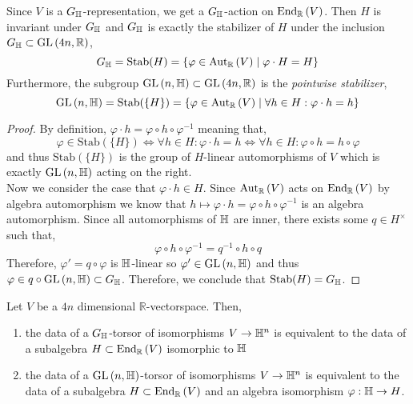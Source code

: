 \documentclass[12pt]{extarticle}
\newcommand{\R}{\mathbb{R}}
\begin{document}
\begin{lemma}
Since $V$ is a $G_{\mathbb{H}}$-representation, we get a $G_{\mathbb{H}}$-action on $\End{\R}{V}$. Then $H$ is invariant under $G_{\mathbb{H}}$ and $G_{\mathbb{H}}$ is exactly the stabilizer of $H$ under the inclusion $G_{\H} \subset \GL{4n, \R}$,
\[ G_{\H} = \mathrm{Stab}(H) = \{ \varphi \in \Aut{\R}{V} \mid \varphi \cdot H = H \} \]
Furthermore, the subgroup $\GL{n, \H} \subset \GL{4n, \R}$ is the \textit{pointwise stabilizer},
\[ \GL{n, \H} = \mathrm{Stab}(\{ H \}) = \{ \varphi \in \Aut{\R}{V} \mid \forall h \in H : \varphi \cdot h = h \} \]
\end{lemma}

\begin{proof}
By definition, $\varphi \cdot h = \varphi \circ h \circ \varphi^{-1}$ meaning that,
\[ \varphi \in \mathrm{Stab}(\{ H \}) \iff \forall h  \in H : \varphi \cdot h = h \iff \forall h \in H : \varphi \circ h = h \circ \varphi \]
and thus $\mathrm{Stab}(\{ H \})$ is the group of $H$-linear automorphisms of $V$ which is exactly $\mathrm{GL}\left(n, \mathbb{H} \right)$ acting on the right.
\bigskip\\
Now we consider the case that $\varphi \cdot h \in H$. Since $\Aut{\R}{V}$ acts on $\End{\R}{V}$ by algebra automorphism we know that $h \mapsto \varphi \cdot h = \varphi \circ h \circ \varphi^{-1}$ is an algebra automorphism. Since all automorphisms of $\mathbb{H}$ are inner, there exists some $q \in H^\times$ such that,
\[ \varphi \circ h \circ \varphi^{-1} = q^{-1} \circ h \circ q \]
Therefore, $\varphi' = q \circ \varphi$ is $\mathbb{H}$-linear so $\varphi' \in \mathrm{GL}\left(n, \mathbb{H} \right)$ and thus $\varphi \in q \circ \mathrm{GL}\left(n, \mathbb{H} \right) \subset G_{\mathbb{H}}$. Therefore, we conclude that $\mathrm{Stab}(H) = G_{\mathbb{H}}$.
\end{proof}

\begin{prop}
Let $V$ be a $4n$ dimensional $\R$-vectorspace. Then,
\begin{enumerate}
\item the data of a $G_{\mathbb{H}}$-torsor of isomorphisms $V \to \mathbb{H}^n$ is equivalent to the data of a subalgebra $H \subset \End{\R}{V}$ isomorphic to $\mathbb{H}$
\item the data of a $\mathrm{GL}\left(n, \mathbb{H} \right)$-torsor of isomorphisms $V \to \mathbb{H}^n$ is equivalent to the data of a subalgebra $H \subset \End{\R}{V}$ and an algebra isomorphism $\varphi : \mathbb{H} \to H$.
\end{enumerate}
\end{prop}
\end{document}
